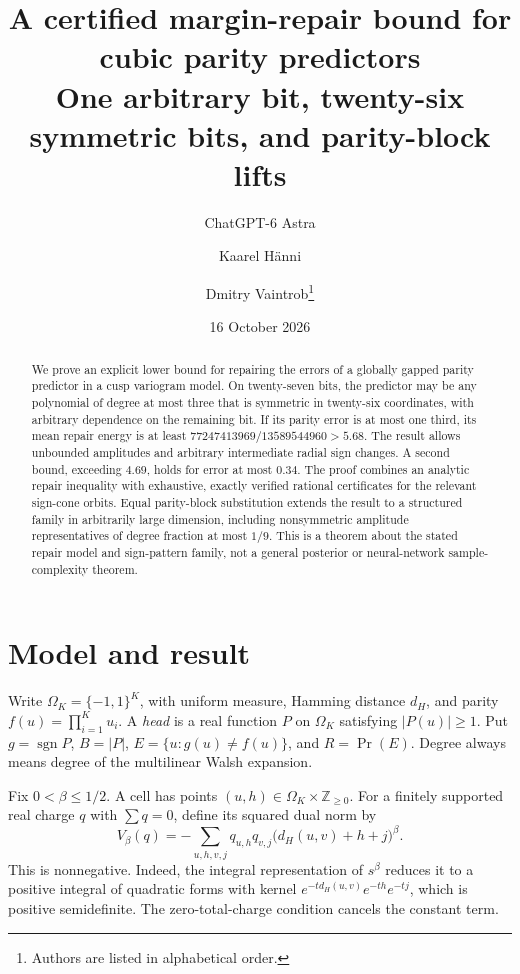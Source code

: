 \documentclass[11pt]{article}
\title{A certified margin-repair bound for cubic parity predictors\\[3pt]\large One arbitrary bit, twenty-six symmetric bits, and parity-block lifts}
\author{ChatGPT-6 Astra \and Kaarel H\"anni \and Dmitry Vaintrob\thanks{Authors are listed in alphabetical order.}}
\date{16 October 2026}
\newcommand{\sgn}{\operatorname{sgn}}
\begin{document}
\maketitle
\begin{abstract}
We prove an explicit lower bound for repairing the errors of a globally gapped parity predictor in a cusp variogram model. On twenty-seven bits, the predictor may be any polynomial of degree at most three that is symmetric in twenty-six coordinates, with arbitrary dependence on the remaining bit. If its parity error is at most one third, its mean repair energy is at least $77247413969/13589544960>5.68$. The result allows unbounded amplitudes and arbitrary intermediate radial sign changes. A second bound, exceeding $4.69$, holds for error at most $0.34$. The proof combines an analytic repair inequality with exhaustive, exactly verified rational certificates for the relevant sign-cone orbits. Equal parity-block substitution extends the result to a structured family in arbitrarily large dimension, including nonsymmetric amplitude representatives of degree fraction at most $1/9$. This is a theorem about the stated repair model and sign-pattern family, not a general posterior or neural-network sample-complexity theorem.
\end{abstract}

\section{Model and result}
Write $\Omega_K=\{-1,1\}^K$, with uniform measure, Hamming distance $d_H$, and parity $f(u)=\prod_{i=1}^K u_i$. A \emph{head} is a real function $P$ on $\Omega_K$ satisfying $|P(u)|\ge1$. Put $g=\sgn P$, $B=|P|$, $E=\{u:g(u)\ne f(u)\}$, and $R=\Pr(E)$. Degree always means degree of the multilinear Walsh expansion.

Fix $0<\beta\le1/2$. A cell has points $(u,h)\in\Omega_K\times\mathbb Z_{\ge0}$. For a finitely supported real charge $q$ with $\sum q=0$, define its squared dual norm by
\begin{equation}\label{eq:variance}
 V_\beta(q)=-\sum_{u,h,v,j}q_{u,h}q_{v,j}\bigl(d_H(u,v)+h+j\bigr)^\beta.
\end{equation}
This is nonnegative. Indeed, the integral representation of $s^\beta$ reduces it to a positive integral of quadratic forms with kernel $e^{-t d_H(u,v)}e^{-th}e^{-tj}$, which is positive semidefinite. The zero-total-charge condition cancels the constant term.
\end{document}
